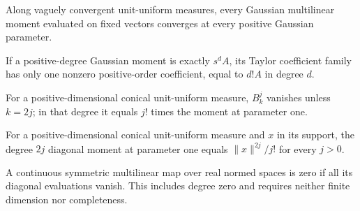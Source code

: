 \begin{lemma}
\label{lem:vague-gaussian-moments}

Along vaguely convergent unit-uniform measures, every Gaussian multilinear moment evaluated on fixed vectors converges at every positive Gaussian parameter.
\end{lemma}

\begin{lemma}
\label{lem:exact-homogeneous-moment-coefficients}

If a positive-degree Gaussian moment is exactly $s^d A$, its Taylor coefficient family has only one nonzero positive-order coefficient, equal to $d!A$ in degree $d$.
\end{lemma}

\begin{lemma}
\label{lem:conical-moment-coefficients}

For a positive-dimensional conical unit-uniform measure, $B_k^j$ vanishes unless $k=2j$; in that degree it equals $j!$ times the moment at parameter one.
\end{lemma}

\begin{lemma}
\label{lem:conical-even-support-moments}

For a positive-dimensional conical unit-uniform measure and $x$ in its support, the degree $2j$ diagonal moment at parameter one equals $\lVert x\rVert^{2j}/j!$ for every $j>0$.
\end{lemma}

\begin{lemma}
\label{lem:symmetric-multilinear-diagonal-injective}

A continuous symmetric multilinear map over real normed spaces is zero if all its diagonal evaluations vanish. This includes degree zero and requires neither finite dimension nor completeness.
\end{lemma}


